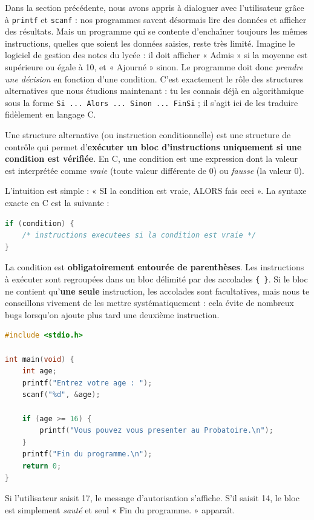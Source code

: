 \documentclass[11pt]{article}
\newcommand{\cle}[1]{{\popxbold\color{popdark}#1}}
\newcounter{popsec}
\newcounter{popsub}
\newcommand{\courssub}[1]{%
  \stepcounter{popsub}%
  \par\vspace{9pt}\noindent{\popxbold\fontsize{11.5}{13}\selectfont\color{popink}{\color{poporange}\thepopsec.\thepopsub}\hspace{6pt}#1}\par\nopagebreak\vspace{4pt}
}
\begin{document}
Dans la section précédente, nous avons appris à dialoguer avec l'utilisateur grâce à \texttt{printf} et \texttt{scanf} : nos programmes savent désormais lire des données et afficher des résultats. Mais un programme qui se contente d'enchaîner toujours les mêmes instructions, quelles que soient les données saisies, reste très limité. Imagine le logiciel de gestion des notes du lycée : il doit afficher « Admis » si la moyenne est supérieure ou égale à 10, et « Ajourné » sinon. Le programme doit donc \emph{prendre une décision} en fonction d'une condition. C'est exactement le rôle des \cle{structures alternatives} que nous étudions maintenant : tu les connais déjà en algorithmique sous la forme \texttt{Si ... Alors ... Sinon ... FinSi} ; il s'agit ici de les traduire fidèlement en langage C.

\courssub{L'instruction \texttt{if} simple}

\begin{definition}
Une \cle{structure alternative} (ou instruction conditionnelle) est une structure de contrôle qui permet d'\textbf{exécuter un bloc d'instructions uniquement si une condition est vérifiée}. En C, une condition est une expression dont la valeur est interprétée comme \emph{vraie} (toute valeur différente de 0) ou \emph{fausse} (la valeur 0).
\end{definition}

L'intuition est simple : « SI la condition est vraie, ALORS fais ceci ». La syntaxe exacte en C est la suivante :

\begin{lstlisting}[language=C]
if (condition) {
    /* instructions executees si la condition est vraie */
}
\end{lstlisting}

La condition est \textbf{obligatoirement entourée de parenthèses}. Les instructions à exécuter sont regroupées dans un \cle{bloc} délimité par des accolades \texttt{\{ \}}. Si le bloc ne contient qu'\textbf{une seule} instruction, les accolades sont facultatives, mais nous te conseillons vivement de les mettre systématiquement : cela évite de nombreux bugs lorsqu'on ajoute plus tard une deuxième instruction.

\begin{exemplebox}
\begin{lstlisting}[language=C]
#include <stdio.h>

int main(void) {
    int age;
    printf("Entrez votre age : ");
    scanf("%d", &age);

    if (age >= 16) {
        printf("Vous pouvez vous presenter au Probatoire.\n");
    }
    printf("Fin du programme.\n");
    return 0;
}
\end{lstlisting}
Si l'utilisateur saisit 17, le message d'autorisation s'affiche. S'il saisit 14, le bloc est simplement \emph{sauté} et seul « Fin du programme. » apparaît.
\end{exemplebox}
\end{document}
